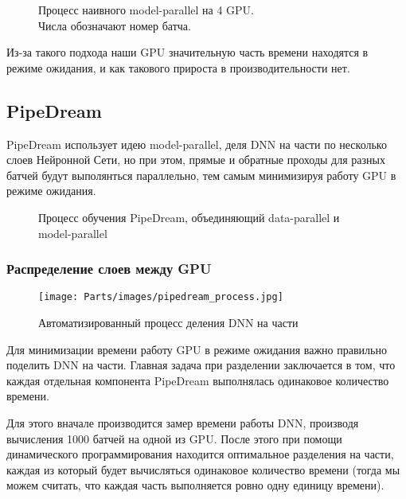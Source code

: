 \begin{figure}[h]%
	\centering
	\caption{Процесс наивного model-parallel на 4 GPU. \\Числа обозначают номер батча.}
	\label{framework} %
\end{figure}

Из-за такого подхода наши GPU значительную часть времени находятся в режиме ожидания, и как такового прироста в производительности нет.

\subsection{PipeDream}
PipeDream использует идею model-parallel, деля DNN на части по несколько слоев Нейронной Сети, но при этом, прямые и обратные проходы для разных батчей будут выполянться параллельно, тем самым минимизируя работу GPU в режиме ожидания.

\begin{figure}[h]%
	\centering
	\caption{Процесс обучения PipeDream, объединяющий data-parallel и model-parallel}
	\label{framework} %
\end{figure}

\newpage
\subsubsection{Распределение слоев между GPU}

\begin{wrapfigure}[14]{r}{0.5\textwidth}
    \vspace{-2cm}
	\begin{center}
		\texttt{[image: Parts/images/pipedream\_process.jpg]}
	\end{center}
	\caption{Автоматизированный процесс деления DNN на части}
    \label{fig:transformer1}
\end{wrapfigure}

Для минимизации времени работу GPU в режиме ожидания важно правильно поделить DNN на части. Главная задача при разделении заключается в том, что каждая отдельная компонента PipeDream выполнялась одинаковое количество времени.

Для этого вначале производится замер времени работы DNN, производя вычисления 1000 батчей на одной из GPU. После этого при помощи динамического программирования находится оптимальное разделения на части, каждая из который будет вычисляться одинаковое количество времени (тогда мы можем считать, что каждая часть выполняется ровно одну единицу времени).

